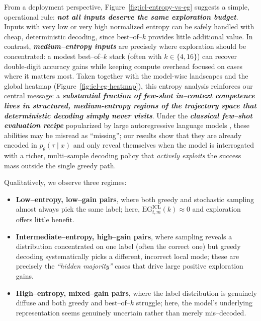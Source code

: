 From a deployment perspective, Figure~\ref{fig:icl-entropy-vs-eg} suggests
a simple, operational rule: \emph{\textbf{not all inputs deserve the
same exploration budget}}.  Inputs with very low or very high normalized
entropy can be safely handled with cheap, deterministic decoding, since
best--of--$k$ provides little additional value.  In contrast,
\emph{\textbf{medium--entropy inputs}} are precisely where exploration
should be concentrated: a modest best--of--$k$ stack (often with
$k \in \{4,16\}$) can recover double-digit accuracy gains while keeping
compute overhead focused on cases where it matters most.  Taken together
with the model-wise landscapes and the global heatmap
(Figure~\ref{fig:icl-eg-heatmap}), this entropy analysis reinforces our
central message: a \emph{\textbf{substantial fraction of few-shot
in--context competence lives in structured, medium-entropy regions of
the trajectory space that deterministic decoding simply never visits}}.
Under the \emph{\textbf{classical few--shot evaluation recipe}}
popularized by large autoregressive language models
\citep{brown2020language,wei2022emergent}, these abilities may be
misread as ``missing''; our results show that they are already encoded
in $p_\theta(\tau\mid x)$ and only reveal themselves when the model is
interrogated with a richer, multi--sample decoding policy that
\emph{actively exploits} the success mass outside the single greedy
path.





Qualitatively, we observe three regimes:

\begin{itemize}[leftmargin=1.5em]
  \item \textbf{Low--entropy, low--gain pairs}, where both greedy and
        stochastic sampling almost always pick the same label; here,
        $\mathrm{EG}^{\text{ICL}}_{t,m}(k)\approx 0$ and exploration
        offers little benefit.
  \item \textbf{Intermediate--entropy, high--gain pairs}, where sampling
        reveals a distribution concentrated on one label (often the
        correct one) but greedy decoding systematically picks a
        different, incorrect local mode; these are precisely the
        \emph{``hidden majority''} cases that drive large positive
        exploration gains.
  \item \textbf{High--entropy, mixed--gain pairs}, where the label
        distribution is genuinely diffuse and both greedy and
        best--of--$k$ struggle; here, the model's underlying
        representation seems genuinely uncertain rather than merely
        mis--decoded.
\end{itemize}

